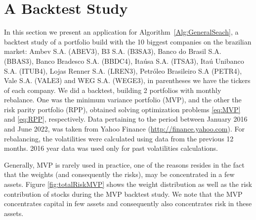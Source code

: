 \section{A Backtest Study}

In this section we present an application for Algorithm~\ref{Alg:GeneralSeach}, a backtest study of a portfolio build with the 10 biggest companies on the brazilian market: Ambev S.A. (ABEV3), B3 S.A. (B3SA3), Banco do Brasil S.A. (BBAS3), Banco Bradesco S.A. (BBDC4), Itaúsa S.A. (ITSA3), Itaú Unibanco S.A. (ITUB4), Lojas Renner S.A. (LREN3), Petróleo Brasileiro S.A (PETR4), Vale S.A. (VALE3) and WEG S.A. (WEGE3), in parentheses we have the tickers of each company.  We did a backtest, building 2 portfolios with monthly rebalance. One was the minimum variance portfolio (MVP), and the other the risk parity portfolio (RPP),  obtained solving optimization problems \eqref{eq:MVP} and \eqref{eq:RPP}, respectively. Data pertaining to the period between January 2016  and June 2022, was taken from Yahoo Finance (\url{http://finance.yahoo.com}). For rebalancing, the volatilities were calculated using data from the previous 12 months. 2016 year data was used only for past volatilities calculations.

Generally, MVP is rarely used in practice, one of the reasons resides in the fact that the weights (and consequently the risks), may be concentrated in a few assets. Figure \ref{fig:totalRiskMVP} shows the weight distribution as well as the risk contribution of stocks during the MVP backtest study. We note that the MVP concentrates capital in few assets and consequently also concentrates risk in these assets.

